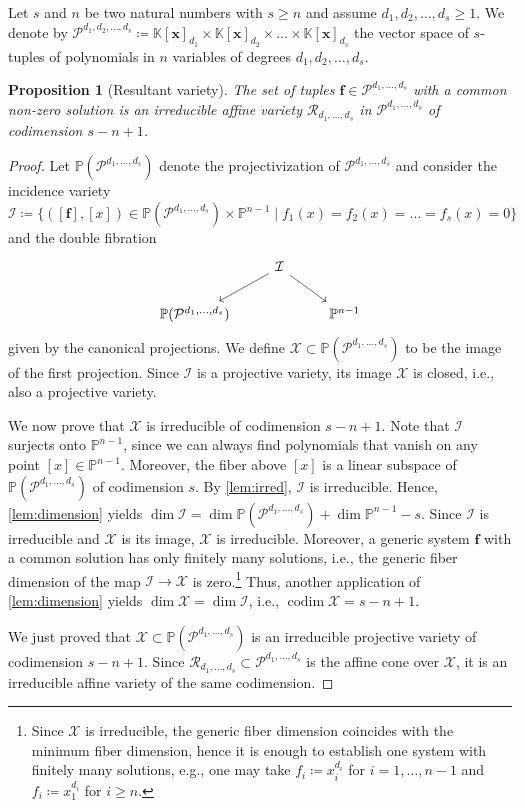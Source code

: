 \documentclass[11pt,a4paper]{article}
\newtheorem{proposition}[theorem]{Proposition}\AddToHook{env/proposition/begin}{\crefalias{theorem}{proposition}}\crefname{proposition}{Proposition}{Propositions}
\numberwithin{equation}{section}
\newcommand{\PP}{\mathbb{P}}
\newcommand{\KK}{\mathbb{K}}
\newcommand{\cR}{\mathcal{R}}
\newcommand{\cX}{\mathcal{X}}
\newcommand{\cP}{\mathcal{P}}
\newcommand{\cI}{\mathcal{I}}
\newcommand{\xx}{\ensuremath{\boldsymbol{x}}}
\newcommand{\ff}{\ensuremath{\boldsymbol{f}}}
\DeclareMathOperator{\codim}{codim}
\begin{document}
Let $s$ and $n$ be two natural numbers with $s\geq n$ and assume $d_1,d_2,\dots,d_s\geq 1$.
We denote by $
\cP^{d_1,d_2,\dots,d_s}\coloneqq \KK[\xx]_{d_1}\times \KK[\xx]_{d_2}\times\dots\times \KK[\xx]_{d_s}
$ the vector space of $s$-tuples of polynomials in $n$ variables of degrees $d_1,d_2,\dots,d_s$.
\begin{proposition}[Resultant variety]
\label{prop:resultant_variety}
The set of tuples $\ff\in\cP^{d_1,\dots,d_s}$ with a common non-zero solution is an irreducible affine variety $\cR_{d_1,\dots,d_s}$ in $\cP^{d_1,\dots,d_s}$ of codimension $s-n+1$.
\end{proposition}
\begin{proof}
Let $\PP(\cP^{d_1,\dots,d_s})$ denote the projectivization of $\cP^{d_1,\dots,d_s}$ and consider the incidence variety \[
	\cI\coloneqq \{ ([\ff],[x])\in \PP(\cP^{d_1,\dots,d_s})\times\PP^{n-1}\mid f_1(x) = f_2(x) =\dots =f_s(x)=0 \}
	\] 
    and the double fibration 	
    \[
	\begin{tikzcd}
	& \cI \arrow[dl] \arrow[dr] & \\
	\PP(\cP^{d_1,\dots,d_s}) && \PP^{n-1}
	\end{tikzcd}
	\]
	given by the canonical projections. 
    We define $\cX\subset\PP(\cP^{d_1,\dots,d_s})$ to be the image of the first projection.
	Since $\cI$ is a projective variety, its image $\cX$ is closed, i.e., also a projective variety.

    We now prove that $\cX$ is irreducible of codimension $s-n+1$.
	Note that $\cI$ surjects onto $\PP^{n-1}$, since we can always find polynomials that vanish on any point $[x]\in\PP^{n-1}$. 
    Moreover, the fiber above $[x]$ is a linear subspace of $\PP(\cP^{d_1,\dots,d_s})$ of codimension $s$.
    By \cref{lem:irred}, $\cI$ is irreducible.
    Hence, \cref{lem:dimension} yields $\dim\cI=\dim\PP(\cP^{d_1,\dots,d_s})+\dim\PP^{n-1}-s$.
    Since $\cI$ is irreducible and $\cX$ is its image, $\cX$ is irreducible.
	Moreover, a generic system $\ff$ with a common solution has only finitely many solutions, i.e., the generic fiber dimension of the map $\cI\rightarrow\cX$ is zero.\footnote{Since $\cX$ is irreducible, the generic fiber dimension coincides with the minimum fiber dimension, hence it is enough to establish one system with finitely many solutions, e.g., one may take $f_i\coloneqq x_i^{d_i}$ for $i=1,\dots,n-1$ and $f_i\coloneqq x_1^{d_i}$ for $i\geq n$.}
    Thus, another application of \cref{lem:dimension} yields $\dim\cX = \dim \cI$, i.e., $\codim\cX=s-n+1$. 

    We just proved that $\cX\subset\PP(\cP^{d_1,\dots,d_s})$ is an irreducible projective variety of codimension $s-n+1$.
    Since $\cR_{d_1,\dots,d_s}\subset\cP^{d_1,\dots,d_s}$ is the affine cone over $\cX$, it is an irreducible affine variety of the same codimension.
\end{proof}
\end{document}
